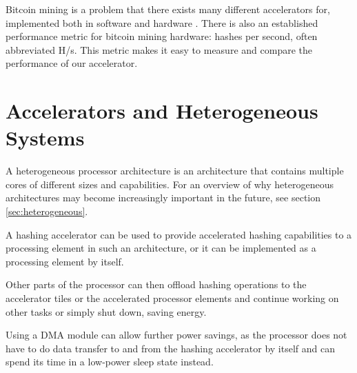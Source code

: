 Bitcoin mining is a problem that there exists many different accelerators
for, implemented both in software and hardware \cite{bespoke-silicon}.
There is also an established performance metric for bitcoin mining hardware:
hashes per second, often abbreviated H/s. This metric makes it easy
to measure and compare the performance of our accelerator.

\section{Accelerators and Heterogeneous Systems}

A heterogeneous processor architecture is an architecture that contains multiple
cores of different sizes and capabilities. For an overview of why heterogeneous
architectures may become increasingly important in the future, see section
\ref{sec:heterogeneous}.

A hashing accelerator can be used to provide accelerated hashing capabilities
to a processing element in such an architecture, or it can be implemented as
a processing element by itself.

Other parts of the processor can then offload hashing operations to the
accelerator tiles or the accelerated processor elements and continue
working on other tasks or simply shut down, saving energy.

Using a DMA module can allow further
power savings, as the processor does not have to do data transfer to
and from the hashing accelerator by itself and can spend its time
in a low-power sleep state instead.

